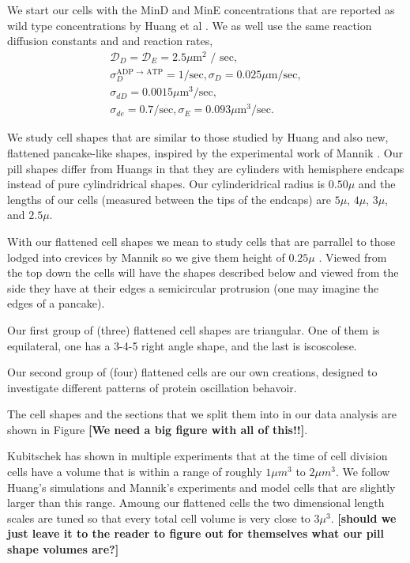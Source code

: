 \documentclass[letterpaper,twocolumn,amsmath,amssymb,pre]{revtex4-1}
\newcommand{\red}[1]{{\bf \color{red} #1}}
\newcommand{\fixme}[1]{\red{[#1]}}
\begin{document}
We start our cells with the MinD and MinE concentrations that are
reported as wild type concentrations by Huang et al . We as well use the same reaction
diffusion constants and and reaction rates,
\begin{gather*} %
  \mathcal{D}_D = \mathcal{D}_{E}  = 2.5 \mu \textrm{m$^2$ / sec}, \\
  \sigma_D^{\textrm{ADP $\rightarrow$ ATP}}  = 1/\textrm{sec},  \sigma_D = 0.025 \mu \textrm{m/sec}, \\
  \sigma_{dD}  = 0.0015 \mu \textrm{m$^3$/sec}, \\
  \sigma_{de}  = 0.7/\textrm{sec}, \sigma_E = 0.093 \mu \textrm{m$^3$/sec}.
\end{gather*}


We study cell shapes that are similar to those studied by Huang and
also new, flattened pancake-like shapes, inspired by the experimental work of
Mannik \cite{mannick2012robustness}.  Our pill shapes differ from
Huangs in that they are cylinders with hemisphere endcaps instead of
pure cylindridrical shapes.  Our cylinderidrical radius is $0.50\mu$
and the lengths of our cells (measured between the tips of the
endcaps) are $5\mu$, $4\mu$, $3\mu$, and $2.5\mu$.

With our flattened cell shapes we mean to study cells that are
parrallel to those lodged into crevices by Mannik so we give them
height of $0.25\mu$ \cite{mannick2012robustness}.  Viewed from the top
down the cells will have the shapes described below and viewed from
the side they have at their edges a semicircular protrusion (one may
imagine the edges of a pancake).

Our first group of (three) flattened cell shapes are triangular.  One
of them is equilateral, one has a 3-4-5 right angle shape, and the
last is iscoscolese.

Our second group of (four) flattened cells are our own creations,
designed to investigate different patterns of protein oscillation
behavoir.

The cell shapes and the sections that we split them into in our data
analysis are shown in Figure \fixme{We need a big figure with all of this!!}.

Kubitschek\cite{kubitschek1990cell} \cite{kubitschek1968linear} has
shown in multiple experiments that at the time of cell division cells
have a volume that is within a range of roughly $1\mu m^3$ to $2\mu
m^3$.  We follow Huang's simulations\cite{huang2003dynamic} and
Mannik's experiments \cite{mannik2012robustness} and model cells that
are slightly larger than this range.  Amoung our flattened cells the
two dimensional length scales are tuned so that every total cell
volume is very close to $3\mu^3$.  \fixme{should we just leave it to
  the reader to figure out for themselves what our pill shape volumes
  are?}
\end{document}
